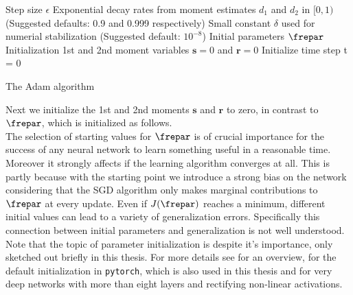 \begin{algorithm}[H]
	\begin{algorithmic}
		\SetAlgoLined
		\REQUIRE Step size $\epsilon$
		\REQUIRE Exponential decay rates from moment estimates $d_1$ and $d_2$ in \([0,1)\)\\
		(Suggested defaults: 0.9 and 0.999 respectively)
		\REQUIRE Small constant $\delta$ used for numerial stabilization (Suggested default: $10^{-8}$)
		\REQUIRE Initial parameters $\frepar$\\
		Initialization 1st and 2nd moment variables \(\mathbf{s}=0\) and \(\mathbf{r}=0\)\;
		Initialize time step t = 0\;
	\end{algorithmic}
	\caption{The Adam algorithm}
	\label{Alg:Adam}
\end{algorithm} 
Next we initialize the 1st and 2nd moments \(\mathbf{s}\) and \(\mathbf{r}\) to zero, in contrast to \(\frepar\), which is initialized as follows.\\
The selection of starting values for \(\frepar\) is of crucial importance for the success of any neural network to learn something useful in a reasonable time. Moreover it strongly affects if the learning algorithm converges at all. This is partly because with the starting point we introduce a strong bias on the network considering that the SGD algorithm only makes marginal contributions to \(\frepar\) at every update. Even if \(J(\frepar)\) reaches a minimum, different initial values can lead to a variety of generalization errors. Specifically this connection between initial parameters and generalization is not well understood. Note that the topic of parameter initialization is despite it's importance, only sketched out briefly in this thesis. For more details see \cite{Goodfellow} for an overview, \cite{LeCun98} for the default initialization in \texttt{pytorch}, which is also used in this thesis and \cite{he2015} for very deep networks with more than eight layers and rectifying non-linear activations.\\
